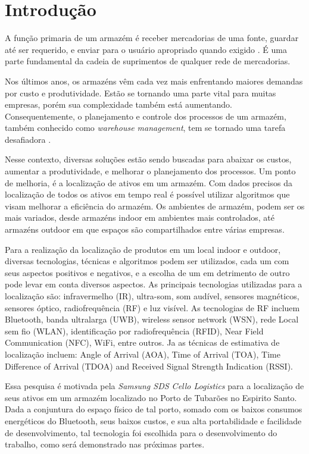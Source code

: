 \chapter{Introdução}
\textual
A função primaria de um armazém é receber mercadorias de uma fonte, guardar até ser requerido, e enviar para o usuário apropriado quando exigido \cite{tompkins}. É uma parte fundamental da cadeia de suprimentos de qualquer rede de mercadorias.

Nos últimos anos, os armazéns vêm cada vez mais enfrentando maiores demandas por custo e produtividade. Estão se tornando uma parte vital para muitas empresas, porém sua complexidade também está aumentando. Consequentemente, o planejamento e controle dos processos de um armazém, também conhecido como \textit{warehouse management}, tem se tornado uma tarefa desafiadora \cite{faber}.

Nesse contexto, diversas soluções estão sendo buscadas para abaixar os custos, aumentar a produtividade, e melhorar o planejamento dos processos.
Um ponto de melhoria, é a localização de ativos em um armazém. Com dados precisos da localização de todos os ativos em tempo real é possível utilizar algoritmos que visam melhorar a eficiência do armazém.
Os ambientes de armazém, podem ser os mais variados, desde armazéns indoor em ambientes mais controlados, até armazéns outdoor em que espaços são compartilhados entre várias empresas.

Para a realização da localização de produtos em um local indoor e outdoor, diversas tecnologias, técnicas e algoritmos podem ser utilizados, cada um com seus aspectos positivos e negativos, e a escolha de um em detrimento de outro pode levar em conta diversos aspectos. As principais tecnologias utilizadas para a localização são: infravermelho (IR), ultra-som, som audível, sensores magnéticos, sensores óptico, radiofrequência (RF) e luz visível. As tecnologias de RF incluem Bluetooth, banda ultralarga (UWB), wireless sensor network (WSN), rede Local sem fio (WLAN), identificação por radiofrequência (RFID), Near Field Communication (NFC), WiFi, entre outros.
Ja as técnicas de estimativa de localização incluem: Angle of Arrival (AOA), Time of Arrival (TOA), Time Difference of Arrival (TDOA) and Received Signal Strength Indication (RSSI).  \cite{art1,art2}

Essa pesquisa é motivada pela \textit{Samsung SDS Cello Logistics} para a localização de seus ativos em um armazém localizado no Porto de Tubarões no Espirito Santo. Dada a conjuntura do espaço físico de tal porto, somado com os baixos consumos energéticos do Bluetooth, seus baixos custos, e sua alta portabilidade e facilidade de desenvolvimento, tal tecnologia foi escolhida para o desenvolvimento do trabalho, como será demonstrado nas próximas partes.
